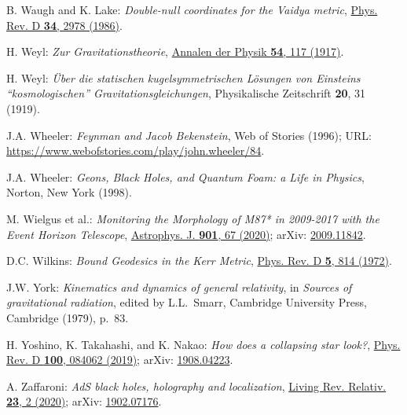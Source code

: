 \begin{thebibliography}{123}
B. Waugh and K. Lake:
{\em Double-null coordinates for the Vaidya metric},
\href{https://doi.org/10.1103/PhysRevD.34.2978}{Phys. Rev. D {\bf 34}, 2978 (1986)}.

H. Weyl:
{\em Zur Gravitationstheorie},
\href{https://doi.org/10.1002/andp.19173591804}{Annalen der Physik {\bf 54}, 117 (1917)}.

H. Weyl:
{\em \"Uber die statischen kugelsymmetrischen L\"osungen von Einsteins ``kosmologischen'' Gravitationsgleichungen},
Physikalische Zeitschrift {\bf 20}, 31 (1919).

J.A. Wheeler:
{\em Feynman and Jacob Bekenstein},
Web of Stories (1996);
URL: \url{https://www.webofstories.com/play/john.wheeler/84}.

J.A. Wheeler:
{\em Geons, Black Holes, and Quantum Foam: a Life in Physics},
Norton, New York (1998).

M. Wielgus et al.:
{\em Monitoring the Morphology of M87* in 2009-2017 with the Event Horizon Telescope},
\href{https://doi.org/10.3847/1538-4357/abac0d}{Astrophys. J. {\bf 901}, 67 (2020)};
arXiv: \href{https://arxiv.org/abs/2009.11842}{2009.11842}.

D.C. Wilkins:
{\em Bound Geodesics in the Kerr Metric},
\href{https://doi.org/10.1103/PhysRevD.5.814}{Phys. Rev. D {\bf 5}, 814 (1972)}.

J.W. York:
{\em Kinematics and dynamics of general relativity},
in {\em Sources of gravitational radiation}, edited by L.L.~Smarr,
Cambridge University Press, Cambridge (1979), p.~83.

H. Yoshino, K. Takahashi, and K. Nakao:
{\em How does a collapsing star look?},
\href{https://doi-org.ezproxy.obspm.fr/10.1103/PhysRevD.100.084062}{Phys. Rev. D {\bf 100}, 084062 (2019)};
arXiv: \href{https://arxiv.org/abs/1908.04223}{1908.04223}.

A. Zaffaroni:
{\em AdS black holes, holography and localization},
\href{https://doi.org/10.1007/s41114-020-00027-8}{Living Rev. Relativ. {\bf 23}, 2 (2020)};
arXiv: \href{https://arxiv.org/abs/1902.07176}{1902.07176}.



\end{thebibliography}

